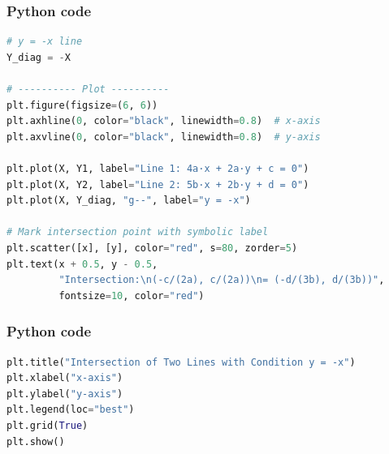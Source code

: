 \documentclass{beamer}
\begin{document}
\begin{frame}[fragile]
    \frametitle{Python code}

    \begin{lstlisting}[language=Python]
# y = -x line
Y_diag = -X

# ---------- Plot ----------
plt.figure(figsize=(6, 6))
plt.axhline(0, color="black", linewidth=0.8)  # x-axis
plt.axvline(0, color="black", linewidth=0.8)  # y-axis

plt.plot(X, Y1, label="Line 1: 4a·x + 2a·y + c = 0")
plt.plot(X, Y2, label="Line 2: 5b·x + 2b·y + d = 0")
plt.plot(X, Y_diag, "g--", label="y = -x")

# Mark intersection point with symbolic label
plt.scatter([x], [y], color="red", s=80, zorder=5)
plt.text(x + 0.5, y - 0.5,
         "Intersection:\n(-c/(2a), c/(2a))\n= (-d/(3b), d/(3b))",
         fontsize=10, color="red")
           \end{lstlisting}
\end{frame}
\begin{frame}[fragile]
    \frametitle{Python code}

    \begin{lstlisting}[language=Python]
plt.title("Intersection of Two Lines with Condition y = -x")
plt.xlabel("x-axis")
plt.ylabel("y-axis")
plt.legend(loc="best")
plt.grid(True)
plt.show()
    \end{lstlisting}
\end{frame}
\end{document}
